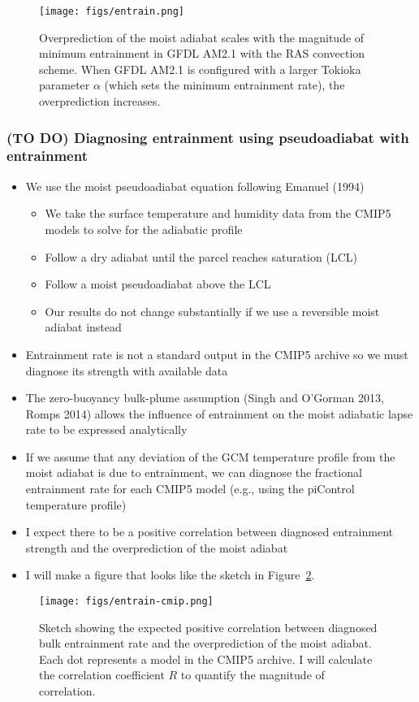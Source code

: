 \documentclass[draft]{agujournal2019}
\begin{document}
\begin{figure}
\centering
\texttt{[image: figs/entrain.png]}
\caption{Overprediction of the moist adiabat scales with the magnitude of minimum entrainment in GFDL AM2.1 with the RAS convection scheme. When GFDL AM2.1 is configured with a larger Tokioka parameter $\alpha$ (which sets the minimum entrainment rate), the overprediction increases.}
\label{fig:entrain}
\end{figure}

\subsubsection{\textbf{(TO DO)} Diagnosing entrainment using pseudoadiabat with entrainment}
\begin{itemize}
\item We use the moist pseudoadiabat equation following Emanuel (1994)
\begin{itemize}
\item We take the surface temperature and humidity data from the CMIP5 models to solve for the adiabatic profile
\item Follow a dry adiabat until the parcel reaches saturation (LCL)
\item Follow a moist pseudoadiabat above the LCL 
\item Our results do not change substantially if we use a reversible moist adiabat instead
\end{itemize}
\item Entrainment rate is not a standard output in the CMIP5 archive so we must diagnose its strength with available data
\item The zero-buoyancy bulk-plume assumption (Singh and O'Gorman 2013, Romps 2014) allows the influence of entrainment on the moist adiabatic lapse rate to be expressed analytically 
\item If we assume that any deviation of the GCM temperature profile from the moist adiabat is due to entrainment, we can diagnose the fractional entrainment rate for each CMIP5 model (e.g., using the piControl temperature profile)
\item I expect there to be a positive correlation between diagnosed entrainment strength and the overprediction of the moist adiabat
\item I will make a figure that looks like the sketch in Figure~\ref{fig:entrain-cmip}.
\end{itemize}

\begin{figure}
\centering
\texttt{[image: figs/entrain-cmip.png]}
\caption{Sketch showing the expected positive correlation between diagnosed bulk entrainment rate and the overprediction of the moist adiabat. Each dot represents a model in the CMIP5 archive. I will calculate the correlation coefficient $R$ to quantify the magnitude of correlation.}
\label{fig:entrain-cmip}
\end{figure}
\end{document}
